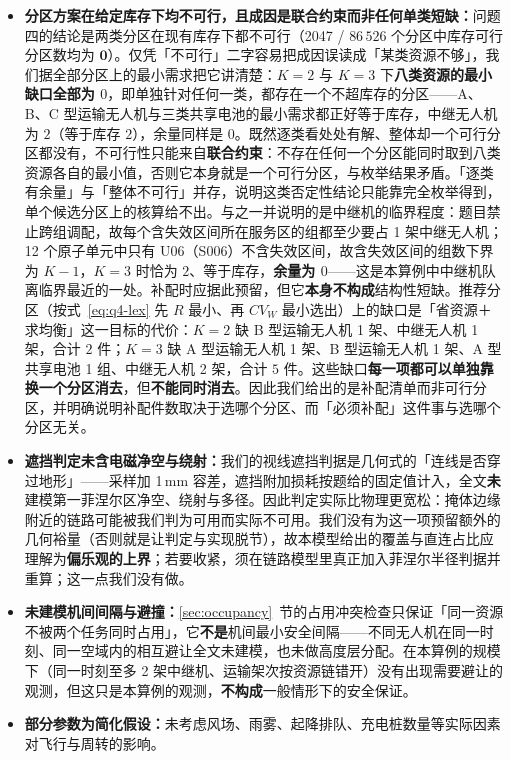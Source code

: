 \begin{itemize}
	\item \textbf{分区方案在给定库存下均不可行，且成因是联合约束而非任何单类短缺：}问题四的结论是两类分区在现有库存下都不可行（2047 / $86\,526$ 个分区中库存可行分区数均为 $\mathbf{0}$）。仅凭「不可行」二字容易把成因误读成「某类资源不够」，我们据全部分区上的最小需求把它讲清楚：$K=2$ 与 $K=3$ 下\textbf{八类资源的最小缺口全部为 $0$}，即单独针对任何一类，都存在一个不超库存的分区——A、B、C 型运输无人机与三类共享电池的最小需求都正好等于库存，中继无人机为 $2$（等于库存 $2$），余量同样是 $0$。既然逐类看处处有解、整体却一个可行分区都没有，不可行性只能来自\textbf{联合约束}：不存在任何一个分区能同时取到八类资源各自的最小值，否则它本身就是一个可行分区，与枚举结果矛盾。「逐类有余量」与「整体不可行」并存，说明这类否定性结论只能靠完全枚举得到，单个候选分区上的核算给不出。与之一并说明的是中继机的临界程度：题目禁止跨组调配，故每个含失效区间所在服务区的组都至少要占 1 架中继无人机；12 个原子单元中只有 U06（S006）不含失效区间，故含失效区间的组数下界为 $K-1$，$K=3$ 时恰为 $2$、等于库存，\textbf{余量为 $0$}——这是本算例中中继机队离临界最近的一处。补配时应据此预留，但它\textbf{本身不构成}结构性短缺。推荐分区（按式~\eqref{eq:q4-lex} 先 $R$ 最小、再 $CV_W$ 最小选出）上的缺口是「省资源＋求均衡」这一目标的代价：$K=2$ 缺 B 型运输无人机 1 架、中继无人机 1 架，合计 $2$ 件；$K=3$ 缺 A 型运输无人机 1 架、B 型运输无人机 1 架、A 型共享电池 1 组、中继无人机 2 架，合计 $5$ 件。这些缺口\textbf{每一项都可以单独靠换一个分区消去}，但\textbf{不能同时消去}。因此我们给出的是补配清单而非可行分区，并明确说明补配件数取决于选哪个分区、而「必须补配」这件事与选哪个分区无关。
	\item \textbf{遮挡判定未含电磁净空与绕射：}我们的视线遮挡判据是几何式的「连线是否穿过地形」——采样加 1\,mm 容差，遮挡附加损耗按题给的固定值计入，全文\textbf{未}建模第一菲涅尔区净空、绕射与多径。因此判定实际比物理更宽松：掩体边缘附近的链路可能被我们判为可用而实际不可用。我们没有为这一项预留额外的几何裕量（否则就是让判定与实现脱节），故本模型给出的覆盖与直连占比应理解为\textbf{偏乐观的上界}；若要收紧，须在链路模型里真正加入菲涅尔半径判据并重算；这一点我们没有做。
	\item \textbf{未建模机间间隔与避撞：}\ref{sec:occupancy}~节的占用冲突检查只保证「同一资源不被两个任务同时占用」，它\textbf{不是}机间最小安全间隔——不同无人机在同一时刻、同一空域内的相互避让全文未建模，也未做高度层分配。在本算例的规模下（同一时刻至多 2 架中继机、运输架次按资源链错开）没有出现需要避让的观测，但这只是本算例的观测，\textbf{不构成}一般情形下的安全保证。
	\item \textbf{部分参数为简化假设：}未考虑风场、雨雾、起降排队、充电桩数量等实际因素对飞行与周转的影响。
\end{itemize}

